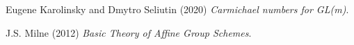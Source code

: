 \documentclass{article}
\theoremstyle{definition}
\theoremstyle{definition}
\begin{document}
\newpage


\begin{thebibliography}{9}

Eugene Karolinsky and Dmytro Seliutin (2020) \emph {Carmichael numbers for GL(m)}.

J.S. Milne (2012) \emph {Basic Theory of Affine Group Schemes}.

\end{thebibliography}
\end{document}
